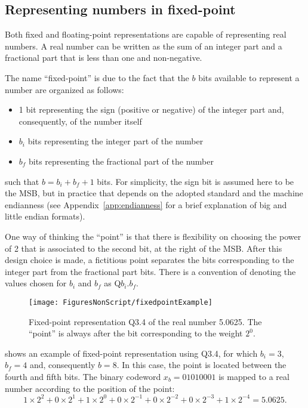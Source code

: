 \subsection{Representing numbers in fixed-point}
\label{sec:fixedPoint}

Both fixed and floating-point representations are capable of representing real numbers. A real number can be written as the sum of an integer part and a fractional part that is less than one and non-negative.

The name ``fixed-point''  is due to the fact that the $b$ bits available to represent a number are organized as follows:
\begin{itemize}
	\item 1 bit representing the sign (positive or negative) of the integer part and, consequently, of the number itself
	\item $b_i$ bits representing the integer part of the number
	\item $b_f$ bits representing the fractional part of the number
\end{itemize}
such that $b=b_i+b_f+1$ bits. For simplicity, the sign bit is assumed here to be the MSB, but in practice that depends on the adopted standard and the machine endianness (see Appendix~\ref{app:endianness} for a brief explanation of big and little endian formats). 

One way of thinking the ``point'' is that there is flexibility on choosing the power of 2 that is associated to the second bit, at the right of the MSB. After this design choice is made, a fictitious point separates the bits corresponding to the integer part from the fractional part bits. There is a convention of denoting the values chosen for $b_i$ and $b_f$ as Q$b_i$.$b_f$.

\begin{figure}
	\centering
		\texttt{[image: FiguresNonScript/fixedpointExample]}
	\caption[Fixed-point representation Q3.4 of the real number 5.0625. ]{Fixed-point representation Q3.4 of the real number 5.0625. The ``point'' is always after the bit corresponding to the weight $2^0$.\label{fig:fixedpointExample}}
\end{figure}

 shows an example of fixed-point representation using Q3.4, for which $b_i=3$, $b_f=4$ and, consequently $b=8$. In this case, the point is located between the fourth and fifth bits. The binary codeword $x_b=01010001$ is mapped to a real number according to the position of the point:
\[
1 \times 2^{2} + 0 \times 2^{1} + 1 \times 2^{0} + 0 \times 2^{-1} + 0 \times 2^{-2} + 0 \times 2^{-3} + 1 \times 2^{-4} = 5.0625.
\]

